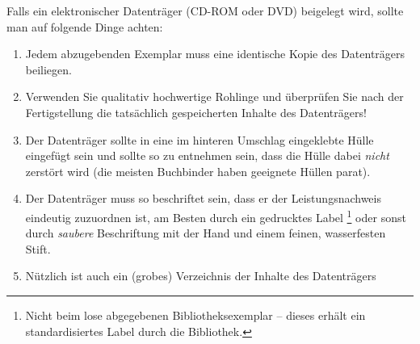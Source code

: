 Falls ein elektronischer Datenträger (CD-ROM oder DVD) beigelegt
wird, sollte man auf folgende Dinge achten:
%
\begin{enumerate}
\item Jedem abzugebenden Exemplar muss eine identische Kopie des
Datenträgers beiliegen. %
\item Verwenden Sie qualitativ hochwertige Rohlinge und überprüfen
Sie nach der Fertigstellung die tatsächlich gespeicherten Inhalte
des Datenträgers! %
\item Der Datenträger sollte in eine im hinteren Umschlag
eingeklebte Hülle eingefügt sein und sollte so zu entnehmen sein,
dass die Hülle dabei \emph{nicht} zerstört wird (die
meisten Buchbinder haben geeignete Hüllen parat). %
\item Der Datenträger muss so beschriftet sein, dass er der
Leistungsnachweis eindeutig zuzuordnen ist, am Besten durch ein
gedrucktes Label%
\footnote{Nicht beim lose abgegebenen Bibliotheksexemplar --
dieses erhält ein standardisiertes Label durch die Bibliothek.} %
oder sonst durch \emph{saubere}
Beschriftung mit
der Hand und einem feinen, wasserfesten Stift. %
\item Nützlich ist auch ein (grobes) Verzeichnis der Inhalte des
Datenträgers
\end{enumerate}
